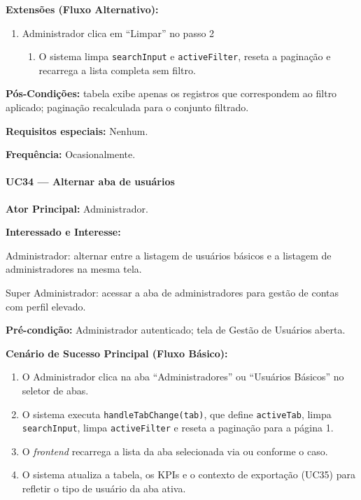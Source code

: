 \textbf{Extensões (Fluxo Alternativo):}

\begin{enumerate}
  \renewcommand{\theenumi}{2a}
  \renewcommand{\labelenumi}{\theenumi.}
  \item Administrador clica em ``Limpar'' no passo 2
  \begin{enumerate}
  \item O sistema limpa \texttt{searchInput} e
        \texttt{activeFilter}, reseta a paginação e
        recarrega a lista completa sem filtro.
  \end{enumerate}
\end{enumerate}

\textbf{Pós-Condições:} tabela exibe apenas os registros
que correspondem ao filtro aplicado; paginação recalculada
para o conjunto filtrado.

\textbf{Requisitos especiais:} Nenhum.

\textbf{Frequência:} Ocasionalmente.

\paragraph{UC34 --- Alternar aba de usuários}\hfill\break

\textbf{Ator Principal:} Administrador.

\textbf{Interessado e Interesse:}

Administrador: alternar entre a listagem de usuários
básicos e a listagem de administradores na mesma tela.

Super Administrador: acessar a aba de administradores
para gestão de contas com perfil elevado.

\textbf{Pré-condição:} Administrador autenticado; tela de
Gestão de Usuários aberta.

\textbf{Cenário de Sucesso Principal (Fluxo Básico):}
\begin{enumerate}
  \item O Administrador clica na aba ``Administradores''
        ou ``Usuários Básicos'' no seletor de abas.
  \item O sistema executa \texttt{handleTabChange(tab)},
        que define \texttt{activeTab}, limpa
        \texttt{searchInput}, limpa \texttt{activeFilter}
        e reseta a paginação para a página 1.
  \item O \textit{frontend} recarrega a lista da aba
        selecionada via
         ou
         conforme o caso.
  \item O sistema atualiza a tabela, os KPIs e o contexto
        de exportação (UC35) para refletir o tipo de
        usuário da aba ativa.
\end{enumerate}

